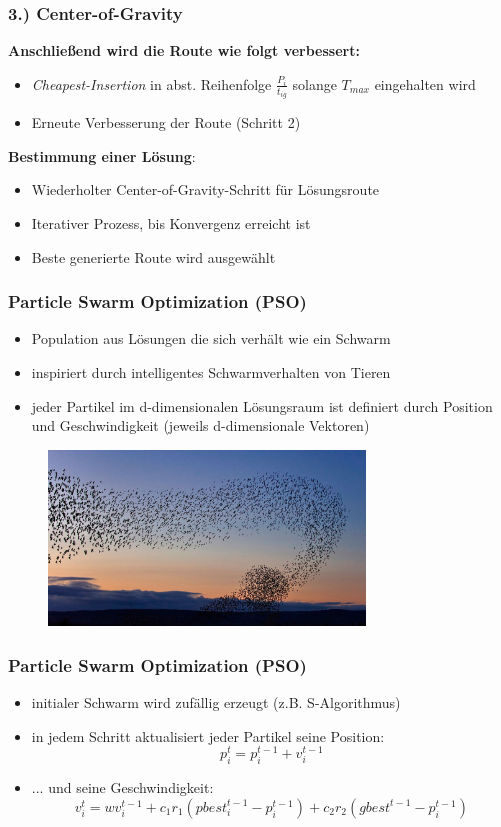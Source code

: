 \documentclass{beamer}
\begin{document}
\begin{frame}
  \frametitle{3.) Center-of-Gravity}
  \textbf{Anschließend wird die Route wie folgt verbessert:}
  \begin{itemize}
    \item \textit{Cheapest-Insertion} in abst. Reihenfolge $\frac{P_i}{t_{ig}}$ solange $T_{max}$ eingehalten wird
    \item Erneute Verbesserung der Route (Schritt 2)
  \end{itemize}
  \textbf{Bestimmung einer Lösung}:
  \begin{itemize}
    \item Wiederholter Center-of-Gravity-Schritt für Lösungsroute
    \item Iterativer Prozess, bis Konvergenz erreicht ist
    \item Beste generierte Route wird ausgewählt
  \end{itemize}
\end{frame}

\begin{frame}
  \frametitle{Particle Swarm Optimization (PSO)}
  \begin{itemize}
    \item Population aus Lösungen die sich verhält wie ein Schwarm
    \item inspiriert durch intelligentes Schwarmverhalten von Tieren
    \item jeder Partikel im d-dimensionalen Lösungsraum ist definiert durch Position und Geschwindigkeit (jeweils d-dimensionale Vektoren)
  \end{itemize}
  \begin{figure}
    \centering
    \includegraphics[width=0.75\textwidth]{img/birds.jpg}
  \end{figure}
\end{frame}

\begin{frame}
  \frametitle{Particle Swarm Optimization (PSO)}
  \begin{itemize}
  \item initialer Schwarm wird zufällig erzeugt (z.B. S-Algorithmus)
  \item in jedem Schritt aktualisiert jeder Partikel seine Position: \[p_i^{t} = p_i^{t-1} + v_i^{t-1} \]
  \item ... und seine Geschwindigkeit:
  \[ v_i^{t} = w v_i^{t-1} + c_1r_1(pbest_i^{t-1} - p_i^{t-1}) + c_2r_2(gbest^{t-1} - p_i^{t-1})\]
  
  
  \end{itemize}
\end{frame}
\end{document}
